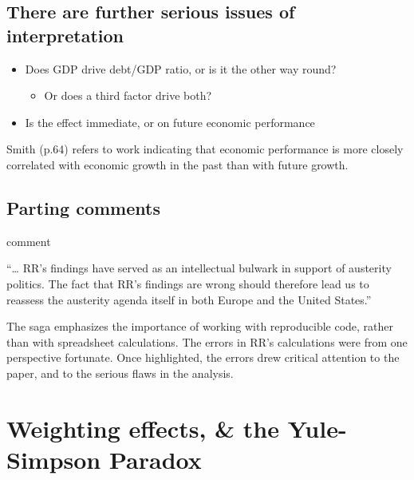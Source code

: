 \documentclass[
  10pt,
  b5paper]{book}
\providecommand{\tightlist}{%
  \setlength{\itemsep}{0pt}\setlength{\parskip}{0pt}}
\begin{document}
\hypertarget{there-are-further-serious-issues-of-interpretation}{%
\section*{There are further serious issues of interpretation}\label{there-are-further-serious-issues-of-interpretation}}

\begin{itemize}
\tightlist
\item
  Does GDP drive debt/GDP ratio, or is it the other way round?

  \begin{itemize}
  \tightlist
  \item
    Or does a third factor drive both?
  \end{itemize}
\item
  Is the effect immediate, or on future economic performance
\end{itemize}

Smith (p.64) refers to work indicating that economic performance
is more closely correlated with economic growth in the past than
with future growth.

\hypertarget{parting-comments}{%
\section*{Parting comments}\label{parting-comments}}

\citet{herndon2014does} comment

``\ldots{} RR's findings have served as an intellectual bulwark in support of austerity politics. The fact that RR's findings are wrong should therefore lead us to reassess the austerity agenda itself in both Europe and the United States.''

The saga emphasizes the importance of working with reproducible code,
rather than with spreadsheet calculations.
The errors in RR's calculations were from one perspective fortunate.
Once highlighted, the errors drew critical attention to the paper,
and to the serious flaws in the analysis.

\hypertarget{sec:yule1}{%
\chapter{Weighting effects, \& the Yule-Simpson Paradox}\label{sec:yule1}}
\end{document}
